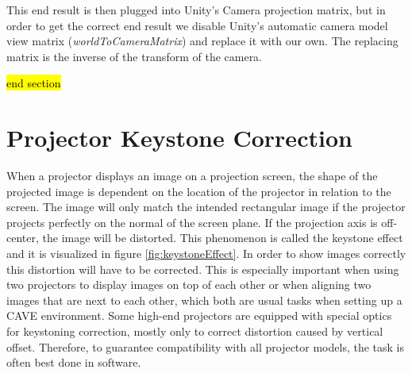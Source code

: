 \documentclass[12pt,a4paper,oneside,pdftex]{report}
\begin{document}
This end result is then plugged into Unity's Camera projection matrix, but in order to get the correct end result we disable Unity's automatic camera model view matrix (\emph{worldToCameraMatrix}) and replace it with our own. The replacing matrix is the inverse of the transform of the camera.

\hl{end section}

\section{Projector Keystone Correction}
\label{section:keystonecorrection}

When a projector displays an image on a projection screen, the shape of the projected image is dependent on the location of the projector in relation to the screen. The image will only match the intended rectangular image if the projector projects perfectly on the normal of the screen plane. If the projection axis is off-center, the image will be distorted. This phenomenon is called the keystone effect and it is visualized in figure \ref{fig:keystoneEffect}. In order to show images correctly this distortion will have to be corrected. This is especially important when using two projectors to display images on top of each other or when aligning two images that are next to each other, which both are usual tasks when setting up a CAVE environment. Some high-end projectors are equipped with special optics for keystoning correction, mostly only to correct distortion caused by vertical offset. Therefore, to guarantee compatibility with all projector models, the task is often best done in software.
\end{document}
